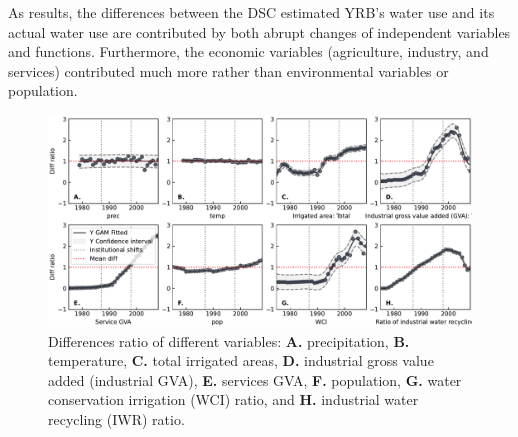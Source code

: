 As results, the differences between the DSC estimated YRB's water use and its actual water use are contributed by both abrupt changes of independent variables and functions. Furthermore, the economic variables (agriculture, industry, and services) contributed much more rather than environmental variables or population.

\begin{figure}
    \includegraphics[width=0.9\linewidth]{outputs/variables.pdf}
    \centering
    \caption{Differences ratio of different variables: \textbf{A.} precipitation, \textbf{B.} temperature, \textbf{C.} total irrigated areas, \textbf{D.} industrial gross value added (industrial GVA), \textbf{E.} services GVA, \textbf{F.} population, \textbf{G.} water conservation irrigation (WCI) ratio, and \textbf{H.} industrial water recycling (IWR) ratio.}
    \label{fig:variables}
\end{figure}







